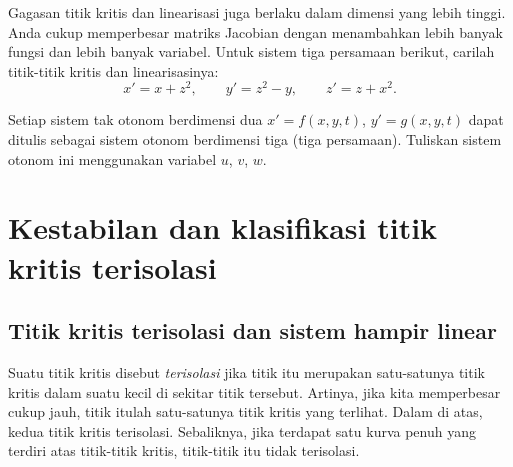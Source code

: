 \begin{samepage}
\begin{exercise}
Gagasan titik kritis dan linearisasi juga berlaku dalam dimensi yang lebih
tinggi. Anda cukup memperbesar matriks Jacobian dengan menambahkan lebih banyak fungsi
dan lebih banyak variabel. Untuk sistem tiga persamaan berikut,
carilah titik-titik kritis dan linearisasinya:
\begin{equation*}
x' = x + z^2, \qquad y' = z^2-y, \qquad z' = z+x^2.
\end{equation*}
\end{exercise}
\end{samepage}

\begin{exercise}
Setiap sistem tak otonom berdimensi dua $x'=f(x,y,t)$, $y'=g(x,y,t)$ dapat
ditulis sebagai sistem otonom berdimensi tiga (tiga persamaan). Tuliskan
sistem otonom ini menggunakan variabel $u$, $v$, $w$.
\end{exercise}


\sectionnewpage
\section{Kestabilan dan klasifikasi titik kritis terisolasi}
\label{nlinstability:section}



\subsection{Titik kritis terisolasi dan sistem hampir linear}

Suatu titik kritis disebut
\emph{terisolasi}
jika titik itu merupakan satu-satunya titik kritis dalam suatu
 kecil di sekitar titik tersebut.
Artinya, jika kita memperbesar cukup jauh, titik itulah
satu-satunya titik kritis yang terlihat.
Dalam  di atas,
kedua titik kritis terisolasi.
Sebaliknya, jika terdapat satu kurva penuh yang terdiri atas titik-titik
kritis, titik-titik itu tidak terisolasi.

